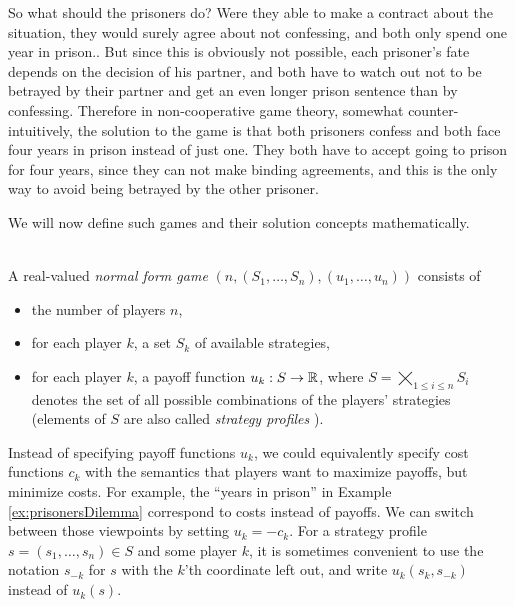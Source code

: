 \documentclass[a4paper]{scrreprt}
\begin{document}
\begin{ex}
        
        So what should the prisoners do?
        Were they able to make a contract about the situation, they would surely agree about not confessing, and both only spend one year in prison.. But since this is obviously not possible, each prisoner's fate depends on the decision of his partner, and both have to watch out not to be betrayed by their partner and get an even longer prison sentence than by confessing.
        Therefore in non-cooperative game theory, somewhat counter-intuitively, the solution to the game is that both prisoners confess and both face four years in prison instead of just one.
        They both have to accept going to prison for four years, since they can not make binding agreements, and this is the only way to avoid being betrayed by the other prisoner.
        \label{ex:prisonersDilemma}
        \label{ex:gameTheoryIntroductoryExample}
    \end{ex}

    We will now define such games and their solution concepts mathematically.

    \begin{defn}~\\
        A real-valued \emph{normal form game} $(n, (S_1, \dots, S_n), (u_1, \dots, u_n))$ consists of 
        \begin{itemize}
            \item the number of players $n$,
            \item for each player $k$, a set $S_k$ of available strategies,
            \item for each player $k$, a payoff function $u_k: S \to \mathbb{R}$, where $S = \bigtimes\limits_{1\leq i \leq n} S_i$ denotes the set of all possible combinations of the players' strategies (elements of $S$ are also called \emph{strategy profiles} \cite{bib:fudenbergGameTheory}). 
        \end{itemize}
        \label{defn:realValuedGames}
    \end{defn}
    
    Instead of specifying payoff functions $u_k$, we could equivalently specify cost functions $c_k$ with the semantics that players want to maximize payoffs, but minimize costs. For example, the “years in prison” in Example \ref{ex:prisonersDilemma} correspond to costs instead of payoffs. We can switch between those viewpoints by setting $u_k = - c_k$. For a strategy profile $s = (s_1, \dots, s_n) \in S$ and some player $k$, it is sometimes convenient to use the notation $s_{-k}$ for $s$ with the $k$'th coordinate left out, and write $u_k(s_k, s_{-k})$ instead of $u_k(s)$. \cite{bib:nisanAlgorithmicGameTheoryCh1Basic}
    
\end{document}

